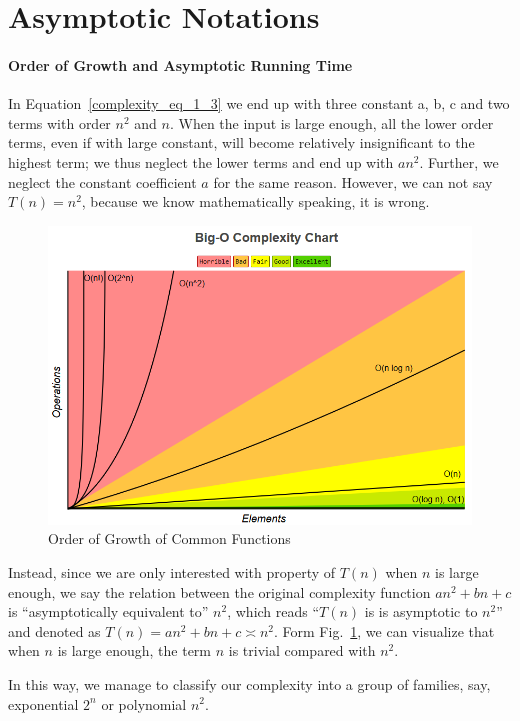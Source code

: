 \documentclass[../main.tex]{subfiles}
\begin{document}
\section{Asymptotic Notations}
\paragraph{Order of Growth and Asymptotic Running Time} In Equation~\ref{complexity_eq_1_3} we end up with three constant a, b, c and two terms with order  $n^2$ and $n$. When the input is large enough, all the lower order terms, even if with large constant,  will become relatively insignificant to the highest term; we thus neglect the lower terms and end up with $an^2$. Further, we neglect the constant coefficient $a$ for the same reason. However, we can not say $T(n)=n^2$, because we know mathematically speaking, it is wrong. 
\begin{figure}[h!]
    \centering
    \includegraphics[width=0.8\columnwidth]{fig/big_o_complexity_chart.png}
    \caption{Order of Growth of Common Functions}
    \label{fig:big_o_complexity_chart}
\end{figure}

Instead, since we are only interested with property of $T(n)$ when $n$ is large enough, we say the relation between the original complexity function $an^2+bn+c$ is ``asymptotically equivalent to''  $n^2$, which reads ``$T(n)$ is is asymptotic to $n^2$'' and denoted as $T(n)=an^2+bn+c \asymp n^2$. Form Fig.~\ref{fig:big_o_complexity_chart}, we can visualize that when $n$ is large enough, the term $n$ is trivial compared with $n^2$. 

In this way, we manage to classify our complexity into a group of families, say, exponential $2^n$ or polynomial $n^2$.%
\end{document}
